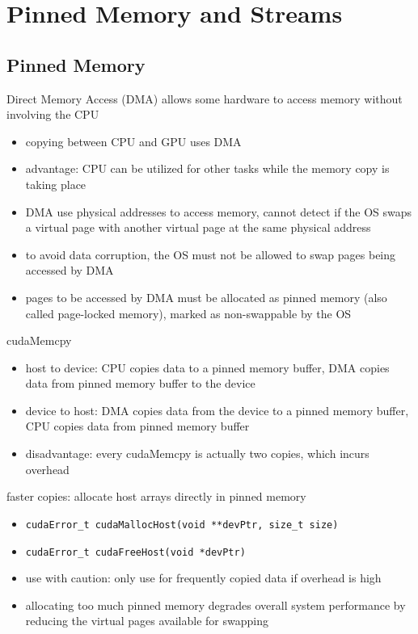 \documentclass{article}
\begin{document}
\newpage
\section{Pinned Memory and Streams}

\subsection{Pinned Memory}

Direct Memory Access (DMA) allows some hardware to access memory without involving the CPU

\begin{itemize}
\item copying between CPU and GPU uses DMA
\item advantage: CPU can be utilized for other tasks while the memory copy is taking place
\item DMA use physical addresses to access memory, cannot detect if the OS swaps a virtual page with another virtual page at the same physical address
\item to avoid data corruption, the OS must not be allowed to swap pages being accessed by DMA
\item pages to be accessed by DMA must be allocated as pinned memory (also called page-locked memory), marked as non-swappable by the OS

\end{itemize}
cudaMemcpy

\begin{itemize}
\item host to device: CPU copies data to a pinned memory buffer, DMA copies data from pinned memory buffer to the device
\item device to host: DMA copies data from the device to a pinned memory buffer, CPU copies data from pinned memory buffer
\item disadvantage: every cudaMemcpy is actually two copies, which incurs overhead

\end{itemize}
faster copies: allocate host arrays directly in pinned memory

\begin{itemize}
\item \texttt{cudaError\_t cudaMallocHost(void **devPtr, size\_t size)}
\item \texttt{cudaError\_t cudaFreeHost(void *devPtr)}
\item use with caution: only use for frequently copied data if overhead is high
\item allocating too much pinned memory degrades overall system performance by reducing the virtual pages available for swapping

\end{itemize}
\end{document}
